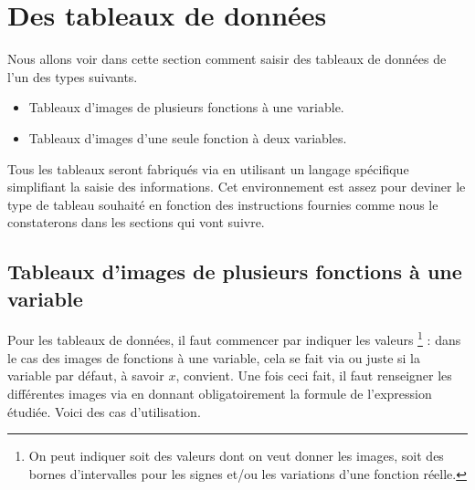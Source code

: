 \documentclass[12pt, a4paper]{article}
\begin{document}
\section{Des tableaux de données}

Nous allons voir dans cette section comment saisir des tableaux de données de l'un des types suivants.
\begin{itemize}
	\item Tableaux d'images de plusieurs fonctions à une variable.

	\item Tableaux d'images d'une seule fonction à deux variables.
\end{itemize}


\begin{tdocnote}
	Tous les tableaux seront fabriqués via  en utilisant un langage spécifique simplifiant la saisie des informations.
	Cet environnement est assez  pour deviner le type de tableau souhaité en fonction des instructions fournies comme nous le constaterons dans les sections qui vont suivre.
\end{tdocnote}





\subsection{Tableaux d'images de plusieurs fonctions à une variable}

Pour les tableaux de données, il faut commencer par indiquer les valeurs 
\footnote{
	 On peut indiquer soit des valeurs dont on veut donner les images, soit des bornes d'intervalles pour les signes et/ou les variations d'une fonction réelle.
} :
dans le cas des images de fonctions à une variable, cela se fait via
ou juste
si la variable par défaut, à savoir $x$, convient.
Une fois ceci fait, il faut renseigner les différentes images via  en donnant obligatoirement la formule de l'expression étudiée.
Voici des cas d'utilisation.




\begin{tdocexa}
    \leavevmode

\end{tdocexa}
\end{document}
